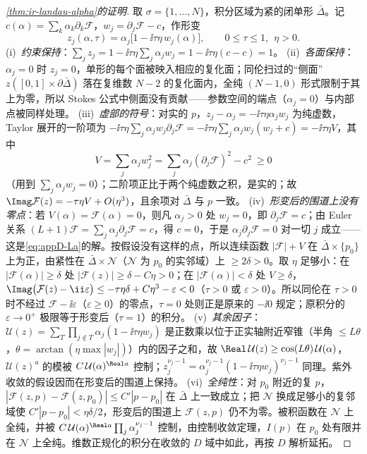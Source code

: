 \begin{proof}[\cref{thm:ir-landau-alpha}的证明]
取 $\sigma=\{1,\dots,N\}$，积分区域为紧的闭单形 $\bar\Delta$。记 $c(\alpha)=\sum_k\alpha_k\partial_k\mathcal F$，$w_j=\partial_j\mathcal F-c$，作形变
\begin{equation}\label{eq:appD-deform}
z_j(\alpha,\tau)=\alpha_j\big[1-\ii\tau\eta\,w_j(\alpha)\big],\qquad 0\le\tau\le1,\ \ \eta>0 .
\end{equation}
(i)~\emph{约束保持}：$\sum_jz_j=1-\ii\tau\eta\sum_j\alpha_jw_j=1-\ii\tau\eta(c-c)=1$。
(ii)~\emph{各面保持}：$\alpha_j=0$ 时 $z_j=0$，单形的每个面被映入相应的复化面；同伦扫过的“侧面” $z([0,1]\times\partial\bar\Delta)$ 落在复维数 $N-2$ 的复化面内，全纯 $(N-1,0)$ 形式限制于其上为零，所以 Stokes 公式中侧面没有贡献——参数空间的端点（$\alpha_j=0$）与内部点被同样处理。
(iii)~\emph{虚部的符号}：对实的 $p$，$z_j-\alpha_j=-\ii\tau\eta\alpha_jw_j$ 为纯虚数，Taylor 展开的一阶项为 $-\ii\tau\eta\sum_j\alpha_jw_j\partial_j\mathcal F=-\ii\tau\eta\sum_j\alpha_jw_j(w_j+c)=-\ii\tau\eta V$，其中
\[
V=\sum_j\alpha_jw_j^2=\sum_j\alpha_j(\partial_j\mathcal F)^2-c^2\ \ge0
\]
（用到 $\sum_j\alpha_jw_j=0$）；二阶项正比于两个纯虚数之积，是实的；故 $\Imag\mathcal F(z)=-\tau\eta V+O(\eta^3)$，且余项对 $\bar\Delta$ 与 $p$ 一致。
(iv)~\emph{形变后的围道上没有零点}：若 $V(\alpha)=\mathcal F(\alpha)=0$，则凡 $\alpha_j>0$ 处 $w_j=0$，即 $\partial_j\mathcal F=c$；由 Euler 关系 $(L+1)\mathcal F=\sum_j\alpha_j\partial_j\mathcal F=c$，得 $c=0$，于是 $\alpha_j\partial_j\mathcal F=0$ 对一切 $j$ 成立——这是\cref{eq:appD-La}的解。按假设没有这样的点，所以连续函数 $|\mathcal F|+V$ 在 $\bar\Delta\times\{p_0\}$ 上为正，由紧性在 $\bar\Delta\times\mathcal N$（$\mathcal N$ 为 $p_0$ 的实邻域）上 $\ge2\delta>0$。取 $\eta$ 足够小：在 $|\mathcal F(\alpha)|\ge\delta$ 处 $|\mathcal F(z)|\ge\delta-C\eta>0$；在 $|\mathcal F(\alpha)|<\delta$ 处 $V\ge\delta$，$\Imag\big(\mathcal F(z)-\ii\varepsilon\big)\le-\tau\eta\delta+C\eta^3-\varepsilon<0$（$\tau>0$ 或 $\varepsilon>0$）。所以同伦在 $\tau>0$ 时不经过 $\mathcal F-\ii\varepsilon$（$\varepsilon\ge0$）的零点，$\tau=0$ 处则正是原来的 $-\ii0$ 规定；原积分的 $\varepsilon\to0^+$ 极限等于形变后（$\tau=1$）的积分。
(v)~\emph{其余因子}：$\mathcal U(z)=\sum_{T}\prod_{j\notin T}\alpha_j(1-\ii\tau\eta w_j)$ 是正数乘以位于正实轴附近窄锥（半角 $\le L\theta$，$\theta=\arctan(\eta\max|w_j|)$）内的因子之和，故 $\Real\,\mathcal U(z)\ge\cos(L\theta)\,\mathcal U(\alpha)$，$\mathcal U(z)^a$ 的模被 $C\,\mathcal U(\alpha)^{\Real a}$ 控制；$z_j^{\nu_j-1}=\alpha_j^{\nu_j-1}(1-\ii\tau\eta w_j)^{\nu_j-1}$ 同理。紫外收敛的假设因而在形变后的围道上保持。
(vi)~\emph{全纯性}：对 $p_0$ 附近的复 $p$，$|\mathcal F(z,p)-\mathcal F(z,p_0)|\le C'|p-p_0|$ 在 $\bar\Delta$ 上一致成立；把 $\mathcal N$ 换成足够小的复邻域使 $C'|p-p_0|<\eta\delta/2$，形变后的围道上 $\mathcal F(z,p)$ 仍不为零。被积函数在 $\mathcal N$ 上全纯，并被 $C\,\mathcal U(\alpha)^{\Real a}\prod_j\alpha_j^{\nu_j-1}$ 控制，由控制收敛定理，$I(p)$ 在 $p_0$ 处有限并在 $\mathcal N$ 上全纯。维数正规化的积分在收敛的 $D$ 域中如此，再按 $D$ 解析延拓。
\end{proof}

